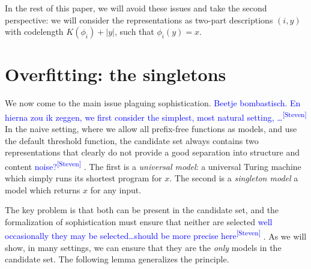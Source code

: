 \documentclass{style/llncs}
\newcommand{\sdr}[1]{\textcolor{blue}{\small #1\textsuperscript{[Steven]} }}
\begin{document}
In the rest of this paper, we will avoid these issues and take the second perspective: we will consider the representations as two-part descriptions $(i, y)$ with codelength $K(\phi_i) + |y|$, such that $\phi_i(y)=x$. 

\section{Overfitting: the singletons}
\label{section:overfitting}
We now come to the main issue plaguing sophistication. \sdr{Beetje bombastisch. En hierna zou ik zeggen, we first consider the simplest, most natural setting, \dots} In the naive setting, where we allow all prefix-free functions as models, and use the default threshold function, the candidate set always contains two representations that clearly do not provide a good separation into structure and content \sdr{noise?}. The first is a \emph{universal model}: a universal Turing machine which simply runs its shortest program for $x$. The second is a \emph{singleton model} a model which returns $x$ for any input.

The key problem is that both can be present in the candidate set, and the formalization of sophistication must ensure that neither are selected \sdr{well occasionally they may be selected\dots should be more precise here}. As we will show, in many settings, we can ensure that they are the \emph{only} models in the candidate set. The following lemma generalizes the principle.
\end{document}

